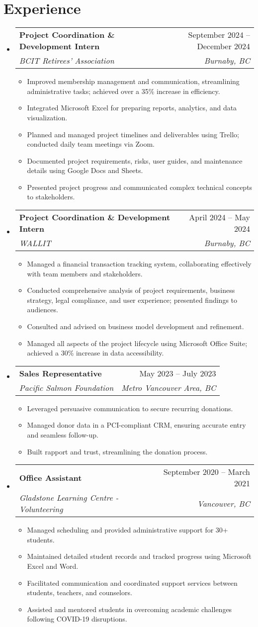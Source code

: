 \documentclass[letterpaper,11pt]{article}
\makeatletter
\newcommand{\resumeItem}[1]{
\item\small{
{#1 \vspace{-2pt}}
}
}
\newcommand{\resumeSubheading}[4]{
\vspace{-2pt}\item
\begin{tabular*}{0.97\textwidth}[t]{l@{\extracolsep{\fill}}r}
\textbf{#1} & #2 \\
\textit{\small#3} & \textit{\small #4} \\
\end{tabular*}\vspace{-7pt}
}
\newcommand{\resumeSubHeadingListStart}{\begin{itemize}[leftmargin=0.15in, label={}]}
\newcommand{\resumeSubHeadingListEnd}{\end{itemize}}
\newcommand{\resumeItemListStart}{\begin{itemize}}
\newcommand{\resumeItemListEnd}{\end{itemize}\vspace{-5pt}}
\makeatother
\begin{document}
\section{Experience}
\resumeSubHeadingListStart
\resumeSubheading{Project Coordination \& Development Intern}{September 2024 – December 2024}{BCIT Retirees' Association}{Burnaby, BC}
\resumeItemListStart
\resumeItem{Improved membership management and communication, streamlining administrative tasks; achieved over a 35\% increase in efficiency.}
\resumeItem{Integrated Microsoft Excel for preparing reports, analytics, and data visualization.}
\resumeItem{Planned and managed project timelines and deliverables using Trello; conducted daily team meetings via Zoom.}
\resumeItem{Documented project requirements, risks, user guides, and maintenance details using Google Docs and Sheets.}
\resumeItem{Presented project progress and communicated complex technical concepts to stakeholders.}
\resumeItemListEnd
\resumeSubheading{Project Coordination \& Development Intern}{April 2024 – May 2024}{WALLIT}{Burnaby, BC}
\resumeItemListStart
\resumeItem{Managed a financial transaction tracking system, collaborating effectively with team members and stakeholders.}
\resumeItem{Conducted comprehensive analysis of project requirements, business strategy, legal compliance, and user experience; presented findings to audiences.}
\resumeItem{Consulted and advised on business model development and refinement.}
\resumeItem{Managed all aspects of the project lifecycle using Microsoft Office Suite; achieved a 30\% increase in data accessibility.}
\resumeItemListEnd
\resumeSubheading{Sales Representative}{May 2023 – July 2023}{Pacific Salmon Foundation}{Metro Vancouver Area, BC}
\resumeItemListStart
\resumeItem{Leveraged persuasive communication to secure recurring donations.}
\resumeItem{Managed donor data in a PCI-compliant CRM, ensuring accurate entry and seamless follow-up.}
\resumeItem{Built rapport and trust, streamlining the donation process.}
\resumeItemListEnd
\resumeSubheading{Office Assistant}{September 2020 – March 2021}{Gladstone Learning Centre - Volunteering}{Vancouver, BC}
\resumeItemListStart
\resumeItem{Managed scheduling and provided administrative support for 30+ students.}
\resumeItem{Maintained detailed student records and tracked progress using Microsoft Excel and Word.}
\resumeItem{Facilitated communication and coordinated support services between students, teachers, and counselors.}
\resumeItem{Assisted and mentored students in overcoming academic challenges following COVID-19 disruptions.}
\resumeItemListEnd
\resumeSubHeadingListEnd
\end{document}
